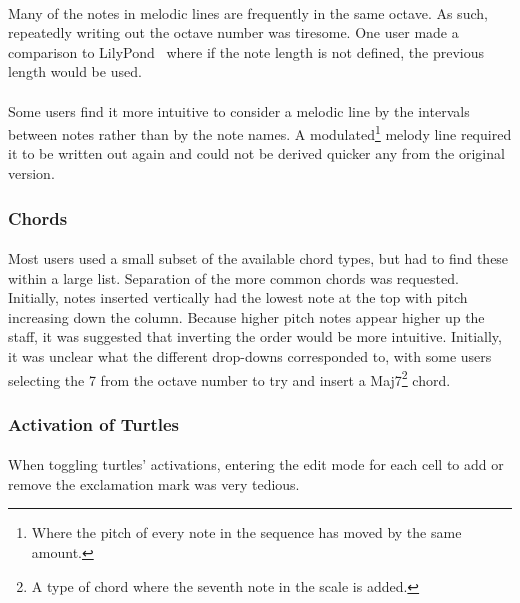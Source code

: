 \paragraph{} Many of the notes in melodic lines are frequently in the same octave. As such, repeatedly writing out the octave number was tiresome. One user made a comparison to LilyPond~\cite{sandberg:lily} where if the note length is not defined, the previous length would be used.

\paragraph{} Some users find it more intuitive to consider a melodic line by the intervals between notes rather than by the note names. A modulated\footnote{Where the pitch of every note in the sequence has moved by the same amount.} melody line required it to be written out again and could not be derived quicker any from the original version.

\subsubsection{Chords}

\paragraph{} Most users used a small subset of the available chord types, but had to find these within a large list. Separation of the more common chords was requested. Initially, notes inserted vertically had the lowest note at the top with pitch increasing down the column. Because higher pitch notes appear higher up the staff, it was suggested that inverting the order would be more intuitive. Initially, it was unclear what the different drop-downs corresponded to, with some users selecting the 7 from the octave number to try and insert a Maj7\footnote{A type of chord where the seventh note in the scale is added.} chord.

\subsubsection{Activation of Turtles}

\paragraph{} When toggling turtles' activations, entering the edit mode for each cell to add or remove the exclamation mark was very tedious.

